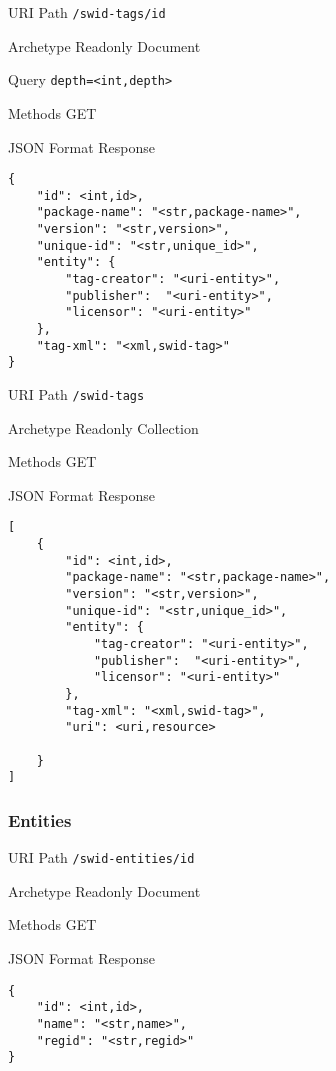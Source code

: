 \documentclass[10pt,a4paper]{scrartcl}
\begin{document}
\begin{mdframed}[style=def]
\begin{description*}
	\item[URI Path] \texttt{/swid-tags/{id}}
	\item[Archetype] Readonly Document
	\item[Query] \texttt{depth=<int,depth>}
	\item[Methods] GET
	\item[JSON Format Response] \hfill
\begin{lstlisting}
{
	"id": <int,id>,
	"package-name": "<str,package-name>",
	"version": "<str,version>",
	"unique-id": "<str,unique_id>",
	"entity": {
		"tag-creator": "<uri-entity>",
		"publisher":  "<uri-entity>",
		"licensor": "<uri-entity>"
	},
	"tag-xml": "<xml,swid-tag>"
}
\end{lstlisting}
\end{description*}
\end{mdframed}

\begin{mdframed}[style=def]
\begin{description*}
	\item[URI Path] \texttt{/swid-tags}
	\item[Archetype] Readonly Collection
	\item[Methods] GET
	\item[JSON Format Response] \hfill
\begin{lstlisting}
[
	{
		"id": <int,id>,
    	"package-name": "<str,package-name>",
    	"version": "<str,version>",
    	"unique-id": "<str,unique_id>",
    	"entity": {
    		"tag-creator": "<uri-entity>",
    		"publisher":  "<uri-entity>",
    		"licensor": "<uri-entity>"
    	},
    	"tag-xml": "<xml,swid-tag>",
    	"uri": <uri,resource>
    	
	}
]
\end{lstlisting}
\end{description*}
\end{mdframed}


\pagebreak
\subsubsection{Entities}

\begin{mdframed}[style=def]
\begin{description*}
	\item[URI Path] \texttt{/swid-entities/{id}}
	\item[Archetype] Readonly Document
	\item[Methods] GET
	\item[JSON Format Response] \hfill
\begin{lstlisting}
{
	"id": <int,id>,
	"name": "<str,name>",
	"regid": "<str,regid>"
}
\end{lstlisting}
\end{description*}
\end{mdframed}
\end{document}
